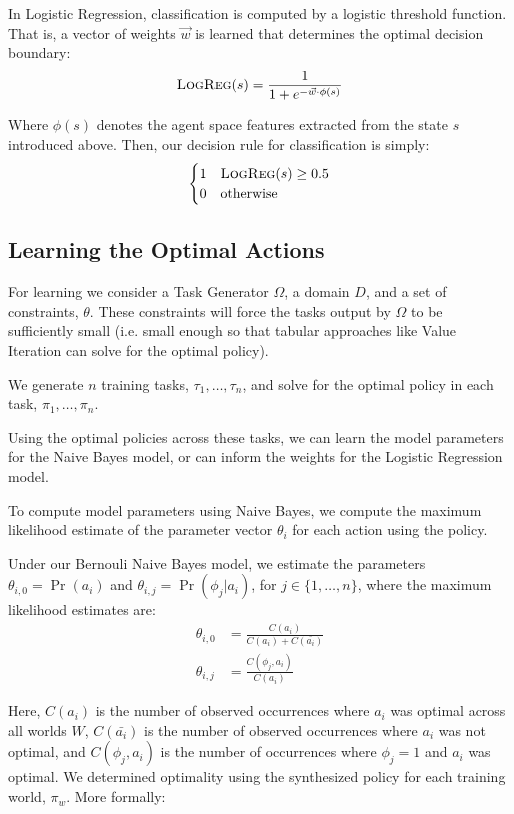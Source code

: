 \documentclass[11pt]{article}
\begin{document}
In Logistic Regression, classification is computed by a logistic threshold function. That is, a vector of weights $\vec{w}$ is learned that determines the optimal decision boundary:
\begin{equation}
\textsc{LogReg}(s) = \frac{1}{1 + e^{-\vec{w} \cdot \phi(s)}}
\end{equation}

Where $\phi(s)$ denotes the agent space features extracted from the state $s$ introduced above. Then, our decision rule for classification is simply:
\begin{equation}
\begin{cases}
1&\textsc{LogReg}(s) \geq 0.5 \\
0&\text{otherwise}
\end{cases}
\end{equation}

\subsection{Learning the Optimal Actions}
For learning we consider a Task Generator $\Omega$, a domain $D$, and a set of constraints, $\theta$. These constraints will force the tasks output by $\Omega$ to be sufficiently small (i.e. small enough so that tabular approaches like Value Iteration can solve for the optimal policy).

We generate $n$ training tasks, $\tau_1, \ldots, \tau_n$, and solve for the optimal policy in each task, $\pi_1, \ldots, \pi_n$.

Using the optimal policies across these tasks, we can learn the model parameters for the Naive Bayes model, or can inform the weights for the Logistic Regression model.

To compute model parameters using Naive Bayes, we compute
the maximum likelihood estimate of the parameter vector $\theta_i$ for
each action using the policy.

Under our Bernouli Naive Bayes model, we estimate the parameters
$\theta_{i,0} = \Pr(a_i)$ and $\theta_{i,j} = \Pr(\phi_j | a_i)$, for $j \in \{1, \ldots, n \}$, where the maximum likelihood estimates are:
\begin{align}
\theta_{i,0} &= \frac{C(a_i)}{C(a_i) + C(\bar{a_i})} \\
\theta_{i,j} &= \frac{C(\phi_j, a_i)}{C(a_i)}
\end{align}

Here, $C(a_i)$ is the number of observed occurrences where $a_i$ was optimal across all worlds $W$,
$C(\bar{a_i})$ is the number of observed occurrences where $a_i$ was not optimal,
and $C(\phi_j, a_i)$ is the number of occurrences where $\phi_j=1$ and $a_i$ was optimal.
We determined optimality using the synthesized policy for each training world, $\pi_w$. More formally:
\end{document}
